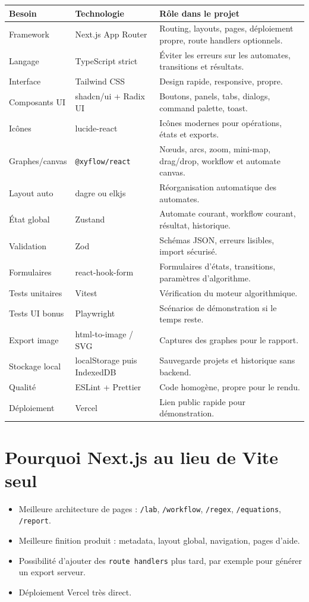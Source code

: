 \documentclass[11pt,a4paper]{report}
\newcommand{\code}[1]{\texttt{#1}}
\begin{document}
\begin{longtable}{p{}p{}p{}}
\toprule
\textbf{Besoin} & \textbf{Technologie} & \textbf{Rôle dans le projet}\\
\midrule
Framework & Next.js App Router & Routing, layouts, pages, déploiement propre, route handlers optionnels.\\
Langage & TypeScript strict & Éviter les erreurs sur les automates, transitions et résultats.\\
Interface & Tailwind CSS & Design rapide, responsive, propre.\\
Composants UI & shadcn/ui + Radix UI & Boutons, panels, tabs, dialogs, command palette, toast.\\
Icônes & lucide-react & Icônes modernes pour opérations, états et exports.\\
Graphes/canvas & \code{@xyflow/react} & Nœuds, arcs, zoom, mini-map, drag/drop, workflow et automate canvas.\\
Layout auto & dagre ou elkjs & Réorganisation automatique des automates.\\
État global & Zustand & Automate courant, workflow courant, résultat, historique.\\
Validation & Zod & Schémas JSON, erreurs lisibles, import sécurisé.\\
Formulaires & react-hook-form & Formulaires d'états, transitions, paramètres d'algorithme.\\
Tests unitaires & Vitest & Vérification du moteur algorithmique.\\
Tests UI bonus & Playwright & Scénarios de démonstration si le temps reste.\\
Export image & html-to-image / SVG & Captures des graphes pour le rapport.\\
Stockage local & localStorage puis IndexedDB & Sauvegarde projets et historique sans backend.\\
Qualité & ESLint + Prettier & Code homogène, propre pour le rendu.\\
Déploiement & Vercel & Lien public rapide pour démonstration.\\
\bottomrule
\end{longtable}

\section{Pourquoi Next.js au lieu de Vite seul}
\begin{itemize}
  \item Meilleure architecture de pages : \code{/lab}, \code{/workflow}, \code{/regex}, \code{/equations}, \code{/report}.
  \item Meilleure finition produit : metadata, layout global, navigation, pages d'aide.
  \item Possibilité d'ajouter des \code{route handlers} plus tard, par exemple pour générer un export serveur.
  \item Déploiement Vercel très direct.
\end{itemize}
\end{document}
